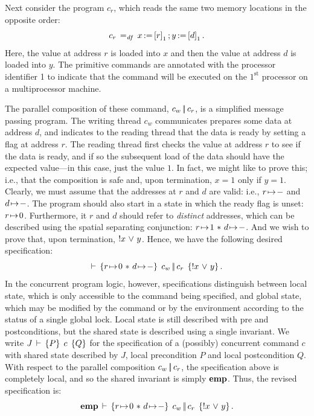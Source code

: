 \documentclass[11pt]{report}
\begin{document}
Next consider the program $c_r$, which reads the same two memory locations in the opposite order: \[ c_r \operatorname{\;=_{\mathit{df}}\;} x \operatorname{:\!=} \left[ r \right]_1 \operatorname{;} y \operatorname{:\!=} \left[ d \right]_1.\] Here, the value at address $r$ is loaded into $x$ and then the value at address $d$ is loaded into $y$. The primitive commands are annotated with the processor identifier 1 to indicate that the command will be executed on the $1^{\mathrm{st}}$ processor on a multiprocessor machine. 

The parallel composition of these command, $c_w \operatorname{|\!|} c_r$, is a simplified message passing program. The writing thread $c_w$ communicates prepares some data at address $d$, and indicates to the reading thread that the data is ready by setting a flag at address $r$. The reading thread first checks the value at address $r$ to see if the data is ready, and if so the subsequent load of the data should have the expected value---in this case, just the value $1$. In fact, we might like to prove this; i.e., that the composition is safe and, upon termination, $x = 1$ only if $y = 1$. Clearly, we must assume that the addresses at $r$ and $d$ are valid: i.e., $r \!\mapsto\! -$ and $d \!\mapsto\! -$. The program should also start in a state in which the ready flag is unset: $r \!\mapsto\! 0$. Furthermore, it $r$ and $d$ should refer to \emph{distinct} addresses, which can be described using the spatial separating conjunction: $r \!\mapsto\! 1 \operatorname{\,\ast\,} d \!\mapsto\! -$. And we wish to prove that, upon termination, $!x \operatorname{\,\vee\,} y$. Hence, we have the following desired specification: \[ \vdash\,\left\lbrace r \!\mapsto\! 0 \operatorname{\,\ast\,} d \!\mapsto\! - \right\rbrace\;c_w \operatorname{|\!|} c_r\;\left\lbrace !x \operatorname{\,\vee\,} y \right\rbrace.\] In the concurrent program logic, however, specifications distinguish between local state, which is only accessible to the command being specified, and global state, which may be modified by the command or by the environment according to the status of a single global lock. Local state is still described with pre and postconditions, but the shared state is described using a single invariant. We write $J\,\vdash\,\left\lbrace P \right\rbrace\;c\;\left\lbrace Q \right\rbrace$ for the specification of a (possibly) concurrent command $c$ with shared state described by $J$, local precondition $P$ and local postcondition $Q$. With respect to the parallel composition $c_w \operatorname{|\!|} c_r$, the specification above is completely local, and so the shared invariant is simply $\mathbf{emp}$. Thus, the revised specification is: \[ \mathbf{emp}\,\vdash\,\left\lbrace r \!\mapsto\! 0 \operatorname{\,\ast\,} d \!\mapsto\! - \right\rbrace\;c_w \operatorname{|\!|} c_r\;\left\lbrace !x \operatorname{\,\vee\,} y \right\rbrace.\]
\end{document}
